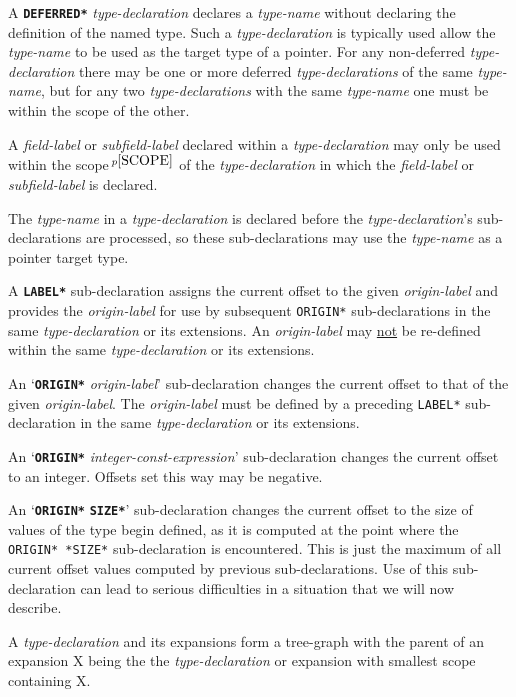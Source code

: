 \documentclass[12pt]{article}
\newcommand{\ttkey}[1]{{\tt \bfseries #1}}
\newcommand{\pagnote}[1]{$\,^{p\pageref{#1}}$}
\begin{document}
A \ttkey{*DEFERRED*} {\em type-declaration} declares a {\em type-name}
without declaring the definition of the named type.
Such a {\em type-declaration} is typically used allow the {\em type-name}
to be used as the target type of a pointer.
For any non-deferred {\em type-declaration} there may be one or more
deferred {\em type-declarations} of the same {\em type-name}, but for
any two {\em type-declarations} with the same {\em type-name}
one must be within the scope of the other.

A {\em field-label} or {\em subfield-label}
declared within a {\em type-declaration} may
only be used within the scope\pagnote{SCOPE} of the {\em type-declaration}
in which the {\em field-label} or {\em subfield-label} is declared.

The {\em type-name} in a {\em type-declaration} is declared before
the {\em type-declaration}'s sub-declarations are processed, so these
sub-declarations may use the {\em type-name} as a pointer target type.

A \ttkey{*LABEL*} sub-declaration assigns the current offset to the
given {\em origin-label} and provides the {\em origin-label}
for use by subsequent {\tt *ORIGIN*} sub-declarations in the
same {\em type-declaration} or its extensions.
An {\em origin-label} may \underline{not} be re-defined within the same
{\em type-declaration} or its extensions.

An `\ttkey{*ORIGIN*} {\em origin-label}' sub-declaration
changes the current offset to that
of the given {\em origin-label}.
The {\em origin-label} must be defined by a preceding
{\tt *LABEL*} sub-declaration in the
same {\em type-declaration} or its extensions.

An `\ttkey{*ORIGIN*} {\em integer-const-expression}' sub-declaration
changes the current offset to an integer.  Offsets set this way
may be negative.

An `\ttkey{*ORIGIN*} \ttkey{*SIZE*}' sub-declaration
changes the current offset to the size of values of the type
begin defined, as it is computed at the point where the {\tt *ORIGIN* *SIZE*}
sub-declaration is encountered.  This is just the maximum of all
current offset values computed by previous sub-declarations.
Use of this sub-declaration can lead to serious difficulties in
a situation that we will now describe.

A {\em type-declaration} and its expansions form a tree-graph
with the parent of an expansion X being the the {\em type-declaration}
or expansion with smallest scope containing X.
\end{document}
